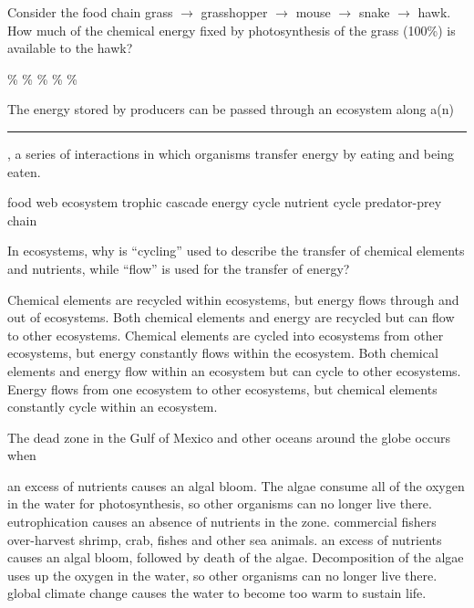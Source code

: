 \question
Consider the food chain grass $\to$ grasshopper $\to$ mouse $\to$ snake $\to$ hawk. How much of the chemical energy fixed by photosynthesis of the grass (100\%) is available to the hawk?

\begin{choices}
\%%
\% %
\% %
\% %
\% %
\end{choices}

\question
The energy stored by producers can be passed through an ecosystem along a(n) \rule{1in}{0.4pt}, a series of interactions in which organisms transfer energy by eating and being eaten.

\begin{choices}
	\correctchoice food web %
	\choice ecosystem %
	\choice trophic cascade %
	\choice energy cycle %
	\choice nutrient cycle %
	\choice predator-prey chain  %
\end{choices}

\question
In ecosystems, why is ``cycling'' used to describe the transfer of chemical elements and nutrients, while ``flow'' is used for the transfer of energy?

\begin{choices}
\correctchoice Chemical elements are recycled within ecosystems, but energy flows through and out of ecosystems.%
\choice Both chemical elements and energy are recycled but can flow to other ecosystems.%
\choice Chemical elements are cycled into ecosystems from other ecosystems, but energy constantly flows within the ecosystem.%
\choice Both chemical elements and energy flow within an ecosystem but can cycle to other ecosystems.%
\choice Energy flows from one ecosystem to other ecosystems, but chemical elements constantly cycle within an ecosystem.%
\end{choices}

\question
The dead zone in the Gulf of Mexico and other oceans around the globe occurs when

\begin{choices}
\choice an excess of nutrients causes an algal bloom. The algae consume all of the oxygen in the water for photosynthesis, so other organisms can no longer live there.%
\choice eutrophication causes an absence of nutrients in the zone.%
\choice commercial fishers over-harvest shrimp, crab, fishes and other sea animals.%
\correctchoice an excess of nutrients causes an algal bloom, followed by death of the algae. Decomposition of the algae uses up the oxygen in the water, so other organisms can no longer live there.%
\choice global climate change causes the water to become too warm to sustain life.%
\end{choices}

